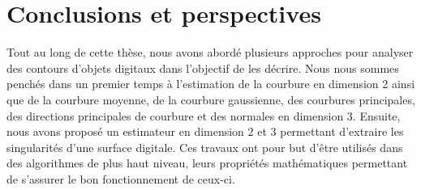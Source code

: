 %
\chapter{Conclusions et perspectives}
\label{sec:conclusion}


Tout au long de cette thèse, nous avons abordé plusieurs approches pour analyser
des contours d'objets digitaux dans l'objectif de les décrire. Nous nous sommes
penchés dans un premier temps à l'estimation de la courbure en dimension 2 ainsi
que de la courbure moyenne, de la courbure gaussienne, des courbures
principales, des directions principales de courbure et des normales en dimension
3. Ensuite, nous avons proposé un estimateur en dimension 2 et 3 permettant
d'extraire les singularités d'une surface digitale. Ces travaux ont pour but
d'être utilisés dans des algorithmes de plus haut niveau, leurs  propriétés
mathématiques permettant de s'assurer le bon fonctionnement de ceux-ci.

